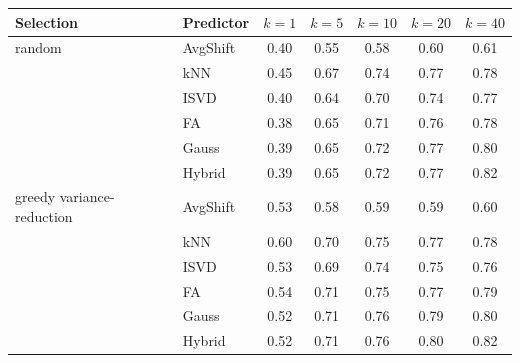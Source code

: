 \begin{tabular}{llccccc}\toprule
Selection & Predictor & $k{=}1$ & $k{=}5$ & $k{=}10$ & $k{=}20$ & $k{=}40$ \\\midrule
random & AvgShift & 0.40 & 0.55 & 0.58 & 0.60 & 0.61 \\
 & kNN & 0.45 & 0.67 & 0.74 & 0.77 & 0.78 \\
 & ISVD & 0.40 & 0.64 & 0.70 & 0.74 & 0.77 \\
 & FA & 0.38 & 0.65 & 0.71 & 0.76 & 0.78 \\
 & Gauss & 0.39 & 0.65 & 0.72 & 0.77 & 0.80 \\
 & Hybrid & 0.39 & 0.65 & 0.72 & 0.77 & 0.82 \\
\midrule
greedy variance-reduction & AvgShift & 0.53 & 0.58 & 0.59 & 0.59 & 0.60 \\
 & kNN & 0.60 & 0.70 & 0.75 & 0.77 & 0.78 \\
 & ISVD & 0.53 & 0.69 & 0.74 & 0.75 & 0.76 \\
 & FA & 0.54 & 0.71 & 0.75 & 0.77 & 0.79 \\
 & Gauss & 0.52 & 0.71 & 0.76 & 0.79 & 0.80 \\
 & Hybrid & 0.52 & 0.71 & 0.76 & 0.80 & 0.82 \\
\bottomrule
\end{tabular}
